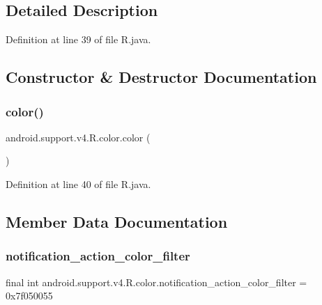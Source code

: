 \subsection{Detailed Description}


Definition at line 39 of file R.\+java.



\subsection{Constructor \& Destructor Documentation}
\mbox{\label{classandroid_1_1support_1_1v4_1_1_r_1_1color_a67527abc01aa30286b974dc8f77e4bfc}} 
\subsubsection{\texorpdfstring{color()}{color()}}
{\footnotesize\ttfamily android.\+support.\+v4.\+R.\+color.\+color (\begin{DoxyParamCaption}{ }\end{DoxyParamCaption})\hspace{0.3cm}{\ttfamily [private]}}



Definition at line 40 of file R.\+java.


\begin{DoxyCode}{0}

\end{DoxyCode}


\subsection{Member Data Documentation}
\mbox{\label{classandroid_1_1support_1_1v4_1_1_r_1_1color_a0e6bd1dee1ba3fbdaf9466f8716e4724}} 
\subsubsection{\texorpdfstring{notification\_action\_color\_filter}{notification\_action\_color\_filter}}
{\footnotesize\ttfamily final int android.\+support.\+v4.\+R.\+color.\+notification\+\_\+action\+\_\+color\+\_\+filter = 0x7f050055\hspace{0.3cm}{\ttfamily [static]}}



